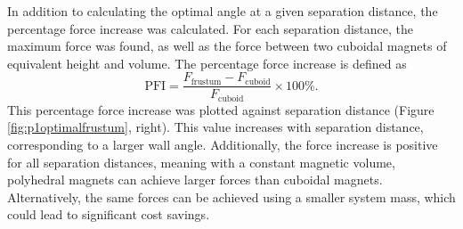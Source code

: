In addition to calculating the optimal angle at a given separation distance, the percentage force increase was calculated. For each separation distance, the maximum force was found, as well as the force between two cuboidal magnets of equivalent height and volume. The percentage force increase is defined as
\begin{equation}
\text{PFI} = \frac{F_\text{frustum}-F_\text{cuboid}}{F_\text{cuboid}} \times 100\% \text{.}
\end{equation}
This percentage force increase was plotted against separation distance (Figure \ref{fig:p1optimalfrustum}, right). This value increases with separation distance, corresponding to a larger wall angle. Additionally, the force increase is positive for all separation distances, meaning with a constant magnetic volume, polyhedral magnets can achieve larger forces than cuboidal magnets. Alternatively, the same forces can be achieved using a smaller system mass, which could lead to significant cost savings.
